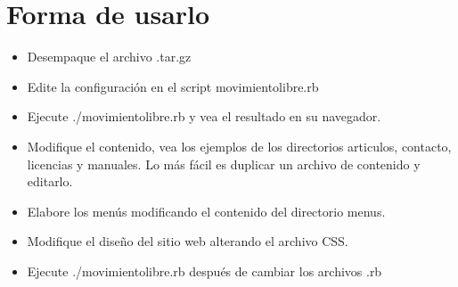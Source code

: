 \documentclass[letterpaper]{article}  %
\begin{document}
\section{Forma de usarlo}

\begin{itemize}
	\item Desempaque el archivo .tar.gz
	\item Edite la configuración en el script movimientolibre.rb
	\item Ejecute ./movimientolibre.rb y vea el resultado en su navegador.
	\item Modifique el contenido, vea los ejemplos de los directorios articulos, contacto, licencias y manuales. Lo más fácil es duplicar un archivo de contenido y editarlo.
	\item Elabore los menús modificando el contenido del directorio menus.
	\item Modifique el diseño del sitio web alterando el archivo CSS.
	\item Ejecute ./movimientolibre.rb después de cambiar los archivos .rb
\end{itemize}
\end{document}
